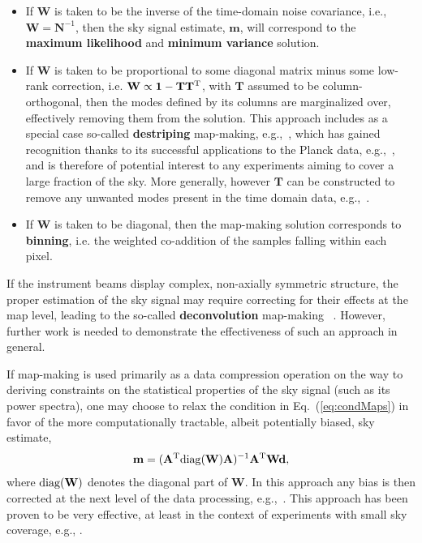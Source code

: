 \begin{itemize}
\item If $\mathbf{W}$ is taken to be the inverse of the time-domain noise covariance, i.e., $\mathbf{W} = \mathbf{N}^{-1}$, then the sky signal estimate, $\mathbf{m}$, will correspond to the {\bf maximum likelihood} and {\bf minimum variance} solution. 
\item If $\mathbf{W}$ is taken to be proportional to some diagonal matrix minus some low-rank correction, i.e. $\mathbf{W} \propto \mathbf{1} - \mathbf{T}\mathbf{T}^{\rm T}$,  with $\mathbf{T}$ assumed to be column-orthogonal, then the modes defined by its columns are marginalized over, effectively removing them from the solution. This approach includes as a special case so-called {\bf destriping} map-making, e.g.,~\cite{Poutanen:2004hy, Keihanen:2003pu}, which has gained recognition thanks to its successful applications to the Planck data, e.g.,~\cite{Keihanen:2009tj, Tristram:2011gq, Ade:2015uua, Adam:2015vua}, and is therefore of potential interest to any experiments aiming to cover a large fraction of the sky. More generally, however $\mathbf{T}$ can be constructed to remove any unwanted modes present in the time domain data, e.g.,~\cite{Stompor:2002jy, Cantalupo:2009if, Dunner:2012vp}.
\item If $\mathbf{W}$ is taken to be diagonal, then the map-making solution corresponds to {\bf binning}, i.e. the weighted co-addition of the samples falling within each pixel.
\end{itemize}
If the instrument beams display complex, non-axially symmetric structure, the proper estimation of the sky signal may require correcting for their effects at the map level, leading to the so-called {\bf deconvolution} map-making ~\cite{Armitage:2004pk, Harrison:2011xt, Keihanen:2012rm}.  However, further work is needed to demonstrate the effectiveness of such an approach in general.

If map-making is used primarily as a data compression operation on the way to deriving constraints on the statistical properties of the sky signal (such as its power spectra), one may choose to relax the condition in Eq.~(\ref{eq:condMaps}) in favor of the more computationally tractable, albeit potentially biased, sky estimate,
\begin{eqnarray}
\mathbf{m} = (\mathbf{A}^{\rm T} {\rm diag}( \mathbf{W}) \mathbf{A})^{-1} \mathbf{A}^{\rm T}\mathbf{W} \mathbf{d},
\end{eqnarray}
where ${\rm diag}( \mathbf{W})$ denotes the diagonal part of $\mathbf{W}$. In this approach any bias is then corrected at the next level of the data processing, e.g.,~\cite{Hivon:2001jp}. This approach has been proven to be very effective, at least in the context of experiments with small sky coverage, e.g., \cite{Culverhouse:2010ya, Schaffer:2011mz, Ade:2014afa, Ade:2014xna}.

